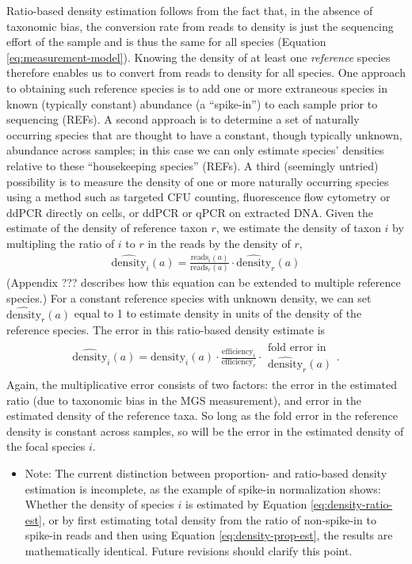\documentclass[
]{article}
\providecommand{\tightlist}{%
  \setlength{\itemsep}{0pt}\setlength{\parskip}{0pt}}
\theoremstyle{definition}
\theoremstyle{definition}
\theoremstyle{definition}
\theoremstyle{definition}
\theoremstyle{remark}
\begin{document}
Ratio-based density estimation follows from the fact that, in the absence of taxonomic bias, the conversion rate from reads to density is just the sequencing effort of the sample and is thus the same for all species (Equation \eqref{eq:measurement-model}).
Knowing the density of at least one \emph{reference} species therefore enables us to convert from reads to density for all species.
One approach to obtaining such reference species is to add one or more extraneous species in known (typically constant) abundance (a ``spike-in'') to each sample prior to sequencing (REFs).
A second approach is to determine a set of naturally occurring species that are thought to have a constant, though typically unknown, abundance across samples; in this case we can only estimate species' densities relative to these ``housekeeping species'' (REFs).
A third (seemingly untried) possibility is to measure the density of one or more naturally occurring species using a method such as targeted CFU counting, fluorescence flow cytometry or ddPCR directly on cells, or ddPCR or qPCR on extracted DNA.
Given the estimate of the density of reference taxon \(r\), we estimate the density of taxon \(i\) by multipling the ratio of \(i\) to \(r\) in the reads by the density of \(r\),
\begin{align}
  \label{eq:density-ratio-est}
  \hat{\text{density}}_{i}(a) = \frac{\text{reads}_{i}(a)}{\text{reads}_{r}(a)} \cdot \hat{\text{density}}_{r}(a)
\end{align}
(Appendix ??? describes how this equation can be extended to multiple reference species.)
For a constant reference species with unknown density, we can set \(\hat{\text{density}}_{r}(a)\) equal to 1 to estimate density in units of the density of the reference species.
The error in this ratio-based density estimate is
\begin{align}
  \label{eq:density-ratio-error}
  \hat{\text{density}}_{i}(a) 
  = \text{density}_{i}(a) \cdot \frac{\text{efficiency}_{i}}{\text{efficiency}_{r}} 
  \cdot \substack{\text{fold error in} \\ \hat{\text{density}}_{r}(a)}.
\end{align}
Again, the multiplicative error consists of two factors: the error in the estimated ratio (due to taxonomic bias in the MGS measurement), and error in the estimated density of the reference taxa.
So long as the fold error in the reference density is constant across samples, so will be the error in the estimated density of the focal species \(i\).

\begin{itemize}
\tightlist
\item
  Note: The current distinction between proportion- and ratio-based density estimation is incomplete, as the example of spike-in normalization shows: Whether the density of species \(i\) is estimated by Equation \eqref{eq:density-ratio-est}, or by first estimating total density from the ratio of non-spike-in to spike-in reads and then using Equation \eqref{eq:density-prop-est}, the results are mathematically identical. Future revisions should clarify this point.
\end{itemize}
\end{document}
